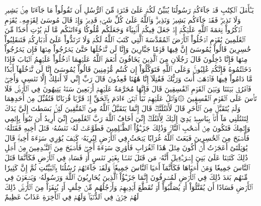 يَـٰٓأَهۡلَ ٱلۡكِتَٰبِ قَدۡ جَآءَكُمۡ رَسُولُنَا يُبَيِّنُ لَكُمۡ عَلَىٰ فَتۡرَةٖ مِّنَ ٱلرُّسُلِ أَن تَقُولُواْ مَا جَآءَنَا مِنۢ بَشِيرٖ وَلَا نَذِيرٖۖ فَقَدۡ جَآءَكُم بَشِيرٞ وَنَذِيرٞۗ وَٱللَّهُ عَلَىٰ كُلِّ شَيۡءٖ قَدِيرٞ
وَإِذۡ قَالَ مُوسَىٰ لِقَوۡمِهِۦ يَٰقَوۡمِ ٱذۡكُرُواْ نِعۡمَةَ ٱللَّهِ عَلَيۡكُمۡ إِذۡ جَعَلَ فِيكُمۡ أَنۢبِيَآءَ وَجَعَلَكُم مُّلُوكٗا وَءَاتَىٰكُم مَّا لَمۡ يُؤۡتِ أَحَدٗا مِّنَ ٱلۡعَٰلَمِينَ
يَٰقَوۡمِ ٱدۡخُلُواْ ٱلۡأَرۡضَ ٱلۡمُقَدَّسَةَ ٱلَّتِي كَتَبَ ٱللَّهُ لَكُمۡ وَلَا تَرۡتَدُّواْ عَلَىٰٓ أَدۡبَارِكُمۡ فَتَنقَلِبُواْ خَٰسِرِينَ
قَالُواْ يَٰمُوسَىٰٓ إِنَّ فِيهَا قَوۡمٗا جَبَّارِينَ وَإِنَّا لَن نَّدۡخُلَهَا حَتَّىٰ يَخۡرُجُواْ مِنۡهَا فَإِن يَخۡرُجُواْ مِنۡهَا فَإِنَّا دَٰخِلُونَ
قَالَ رَجُلَانِ مِنَ ٱلَّذِينَ يَخَافُونَ أَنۡعَمَ ٱللَّهُ عَلَيۡهِمَا ٱدۡخُلُواْ عَلَيۡهِمُ ٱلۡبَابَ فَإِذَا دَخَلۡتُمُوهُ فَإِنَّكُمۡ غَٰلِبُونَۚ وَعَلَى ٱللَّهِ فَتَوَكَّلُوٓاْ إِن كُنتُم مُّؤۡمِنِينَ
قَالُواْ يَٰمُوسَىٰٓ إِنَّا لَن نَّدۡخُلَهَآ أَبَدٗا مَّا دَامُواْ فِيهَا فَٱذۡهَبۡ أَنتَ وَرَبُّكَ فَقَٰتِلَآ إِنَّا هَٰهُنَا قَٰعِدُونَ
قَالَ رَبِّ إِنِّي لَآ أَمۡلِكُ إِلَّا نَفۡسِي وَأَخِيۖ فَٱفۡرُقۡ بَيۡنَنَا وَبَيۡنَ ٱلۡقَوۡمِ ٱلۡفَٰسِقِينَ
قَالَ فَإِنَّهَا مُحَرَّمَةٌ عَلَيۡهِمۡۛ أَرۡبَعِينَ سَنَةٗۛ يَتِيهُونَ فِي ٱلۡأَرۡضِۚ فَلَا تَأۡسَ عَلَى ٱلۡقَوۡمِ ٱلۡفَٰسِقِينَ
۞وَٱتۡلُ عَلَيۡهِمۡ نَبَأَ ٱبۡنَيۡ ءَادَمَ بِٱلۡحَقِّ إِذۡ قَرَّبَا قُرۡبَانٗا فَتُقُبِّلَ مِنۡ أَحَدِهِمَا وَلَمۡ يُتَقَبَّلۡ مِنَ ٱلۡأٓخَرِ قَالَ لَأَقۡتُلَنَّكَۖ قَالَ إِنَّمَا يَتَقَبَّلُ ٱللَّهُ مِنَ ٱلۡمُتَّقِينَ
لَئِنۢ بَسَطتَ إِلَيَّ يَدَكَ لِتَقۡتُلَنِي مَآ أَنَا۠ بِبَاسِطٖ يَدِيَ إِلَيۡكَ لِأَقۡتُلَكَۖ إِنِّيٓ أَخَافُ ٱللَّهَ رَبَّ ٱلۡعَٰلَمِينَ
إِنِّيٓ أُرِيدُ أَن تَبُوٓأَ بِإِثۡمِي وَإِثۡمِكَ فَتَكُونَ مِنۡ أَصۡحَٰبِ ٱلنَّارِۚ وَذَٰلِكَ جَزَـٰٓؤُاْ ٱلظَّـٰلِمِينَ
فَطَوَّعَتۡ لَهُۥ نَفۡسُهُۥ قَتۡلَ أَخِيهِ فَقَتَلَهُۥ فَأَصۡبَحَ مِنَ ٱلۡخَٰسِرِينَ
فَبَعَثَ ٱللَّهُ غُرَابٗا يَبۡحَثُ فِي ٱلۡأَرۡضِ لِيُرِيَهُۥ كَيۡفَ يُوَٰرِي سَوۡءَةَ أَخِيهِۚ قَالَ يَٰوَيۡلَتَىٰٓ أَعَجَزۡتُ أَنۡ أَكُونَ مِثۡلَ هَٰذَا ٱلۡغُرَابِ فَأُوَٰرِيَ سَوۡءَةَ أَخِيۖ فَأَصۡبَحَ مِنَ ٱلنَّـٰدِمِينَ
مِنۡ أَجۡلِ ذَٰلِكَ كَتَبۡنَا عَلَىٰ بَنِيٓ إِسۡرَـٰٓءِيلَ أَنَّهُۥ مَن قَتَلَ نَفۡسَۢا بِغَيۡرِ نَفۡسٍ أَوۡ فَسَادٖ فِي ٱلۡأَرۡضِ فَكَأَنَّمَا قَتَلَ ٱلنَّاسَ جَمِيعٗا وَمَنۡ أَحۡيَاهَا فَكَأَنَّمَآ أَحۡيَا ٱلنَّاسَ جَمِيعٗاۚ وَلَقَدۡ جَآءَتۡهُمۡ رُسُلُنَا بِٱلۡبَيِّنَٰتِ ثُمَّ إِنَّ كَثِيرٗا مِّنۡهُم بَعۡدَ ذَٰلِكَ فِي ٱلۡأَرۡضِ لَمُسۡرِفُونَ
إِنَّمَا جَزَـٰٓؤُاْ ٱلَّذِينَ يُحَارِبُونَ ٱللَّهَ وَرَسُولَهُۥ وَيَسۡعَوۡنَ فِي ٱلۡأَرۡضِ فَسَادًا أَن يُقَتَّلُوٓاْ أَوۡ يُصَلَّبُوٓاْ أَوۡ تُقَطَّعَ أَيۡدِيهِمۡ وَأَرۡجُلُهُم مِّنۡ خِلَٰفٍ أَوۡ يُنفَوۡاْ مِنَ ٱلۡأَرۡضِۚ ذَٰلِكَ لَهُمۡ خِزۡيٞ فِي ٱلدُّنۡيَاۖ وَلَهُمۡ فِي ٱلۡأٓخِرَةِ عَذَابٌ عَظِيمٌ
